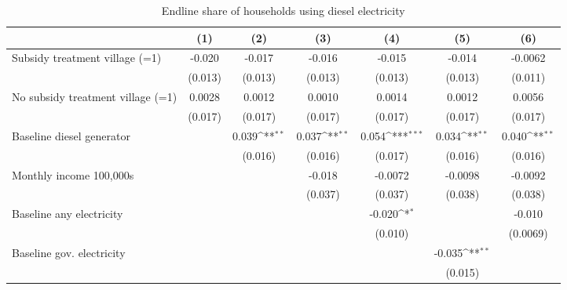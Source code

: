 \begin{table}[htbp]\centering
\def\sym#1{\ifmmode^{#1}\else\(^{#1}\)\fi}
\caption{Endline share of households using diesel electricity}
\begin{tabular*}{1\hsize}{@{\hskip\tabcolsep\extracolsep\fill}l*{6}{c}}
\toprule
                &\multicolumn{1}{c}{(1)}         &\multicolumn{1}{c}{(2)}         &\multicolumn{1}{c}{(3)}         &\multicolumn{1}{c}{(4)}         &\multicolumn{1}{c}{(5)}         &\multicolumn{1}{c}{(6)}         \\
\midrule
Subsidy treatment village (=1)&   -0.020         &   -0.017         &   -0.016         &   -0.015         &   -0.014         &  -0.0062         \\
                &  (0.013)         &  (0.013)         &  (0.013)         &  (0.013)         &  (0.013)         &  (0.011)         \\
No subsidy treatment village (=1)&   0.0028         &   0.0012         &   0.0010         &   0.0014         &   0.0012         &   0.0056         \\
                &  (0.017)         &  (0.017)         &  (0.017)         &  (0.017)         &  (0.017)         &  (0.017)         \\
Baseline diesel generator&                  &    0.039\sym{**} &    0.037\sym{**} &    0.054\sym{***}&    0.034\sym{**} &    0.040\sym{**} \\
                &                  &  (0.016)         &  (0.016)         &  (0.017)         &  (0.016)         &  (0.016)         \\
Monthly income 100,000s&                  &                  &   -0.018         &  -0.0072         &  -0.0098         &  -0.0092         \\
                &                  &                  &  (0.037)         &  (0.037)         &  (0.038)         &  (0.038)         \\
Baseline any electricity&                  &                  &                  &   -0.020\sym{*}  &                  &   -0.010         \\
                &                  &                  &                  &  (0.010)         &                  & (0.0069)         \\
Baseline gov. electricity&                  &                  &                  &                  &   -0.035\sym{**} &                  \\
                &                  &                  &                  &                  &  (0.015)         &                  \\

\end{tabular*}
\end{table}

